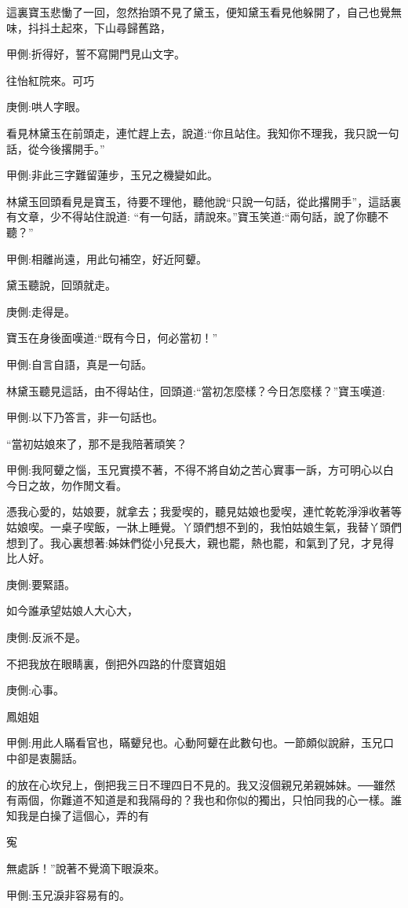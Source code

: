 \begin{parag}
    這裏寶玉悲慟了一回，忽然抬頭不見了黛玉，便知黛玉看見他躲開了，自己也覺無味，抖抖土起來，下山尋歸舊路，\begin{note}甲側:折得好，誓不寫開門見山文字。\end{note}往怡紅院來。可巧\begin{note}庚側:哄人字眼。\end{note}看見林黛玉在前頭走，連忙趕上去，說道:“你且站住。我知你不理我，我只說一句話，從今後撂開手。”\begin{note}甲側:非此三字難留蓮步，玉兄之機變如此。\end{note}林黛玉回頭看見是寶玉，待要不理他，聽他說“只說一句話，從此撂開手”，這話裏有文章，少不得站住說道: “有一句話，請說來。”寶玉笑道:“兩句話，說了你聽不聽？”\begin{note}甲側:相離尚遠，用此句補空，好近阿顰。\end{note}黛玉聽說，回頭就走。\begin{note}庚側:走得是。\end{note}寶玉在身後面嘆道:“既有今日，何必當初！”\begin{note}甲側:自言自語，真是一句話。\end{note}林黛玉聽見這話，由不得站住，回頭道:“當初怎麼樣？今日怎麼樣？”寶玉嘆道:\begin{note}甲側:以下乃答言，非一句話也。\end{note}“當初姑娘來了，那不是我陪著頑笑？\begin{note}甲側:我阿顰之惱，玉兄實摸不著，不得不將自幼之苦心實事一訴，方可明心以白今日之故，勿作閒文看。\end{note}憑我心愛的，姑娘要，就拿去；我愛喫的，聽見姑娘也愛喫，連忙乾乾淨淨收著等姑娘喫。一桌子喫飯，一牀上睡覺。丫頭們想不到的，我怕姑娘生氣，我替丫頭們想到了。我心裏想著:姊妹們從小兒長大，親也罷，熱也罷，和氣到了兒，才見得比人好。\begin{note}庚側:要緊語。\end{note}如今誰承望姑娘人大心大，\begin{note}庚側:反派不是。\end{note}不把我放在眼睛裏，倒把外四路的什麼寶姐姐\begin{note}庚側:心事。\end{note}鳳姐姐\begin{note}甲側:用此人瞞看官也，瞞顰兒也。心動阿顰在此數句也。一節頗似說辭，玉兄口中卻是衷腸話。\end{note}的放在心坎兒上，倒把我三日不理四日不見的。我又沒個親兄弟親姊妹。──雖然有兩個，你難道不知道是和我隔母的？我也和你似的獨出，只怕同我的心一樣。誰知我是白操了這個心，弄的有\begin{note}寃\end{note}無處訴！”說著不覺滴下眼淚來。\begin{note}甲側:玉兄淚非容易有的。\end{note}
\end{parag}


